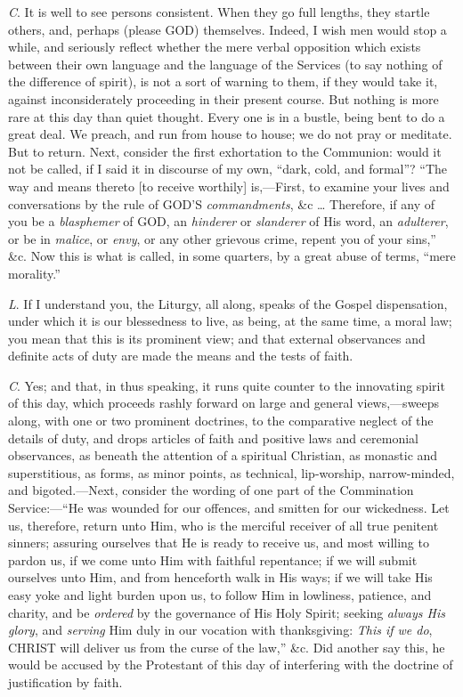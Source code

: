 \emph{C}. It is well to see persons consistent.
When they go full lengths, they startle others, and, perhaps (please GOD)
themselves. Indeed, I wish men would stop a while, and seriously
reflect whether the mere verbal opposition which exists between their
own language and the language of the Services (to say nothing of the
difference of spirit), is not a sort of warning to them, if they would
take it, against inconsiderately proceeding in their present course.
But nothing is more rare at this day than quiet thought. Every one is
in a bustle, being bent to do a great deal. We preach, and run from
house to house; we do not pray or meditate. But to return. Next,
consider the first exhortation to the Communion: would it not be
called, if I said it in discourse of my own, ``dark, cold, and formal''?
``The way and means thereto [to receive worthily] is,—First, to
examine your lives and conversations by the rule of GOD'S
\emph{commandments}, \&c … Therefore, if any of you be a \emph{blasphemer}
of GOD, an \emph{hinderer} or \emph{slanderer}
of His word, an \emph{adulterer}, or be in \emph{malice}, or \emph{envy},
or any other grievous crime, repent you of your sins,'' \&c. Now
this is what is called, in some quarters, by a great abuse of terms, ``mere
morality.''

\emph{L}. If I understand you, the Liturgy, all
along, speaks of the Gospel dispensation, under which it is our
blessedness to live, as being, at the same time, a moral law; you mean
that this is its prominent view; and that external observances and
definite acts of duty are made the means and the tests of faith.

\emph{C}. Yes; and that, in thus speaking, it
runs quite counter to the innovating spirit of this day, which
proceeds rashly forward on large and general views,—sweeps along,
with one or two prominent doctrines, to the comparative neglect of the
details of duty, and drops articles of faith and positive laws and
ceremonial observances, as beneath the attention of a spiritual
Christian, as monastic and superstitious, as forms, as minor points,
as technical, lip-worship, narrow-minded, and bigoted.—Next,
consider the wording of one part of the Commination Service:—``He was
wounded for our offences, and smitten for our wickedness. Let us,
therefore, return unto Him, who is the merciful receiver of all true
penitent sinners; assuring ourselves that He is ready to receive us,
and most willing to pardon us, if we come unto Him with faithful
repentance; if we will submit ourselves unto Him, and from henceforth
walk in His ways; if we will take His easy yoke and light burden upon
us, to follow Him in lowliness, patience, and charity, and be \emph{ordered}
by the governance of His Holy Spirit; seeking \emph{always His glory},
and \emph{serving} Him duly in our vocation with thanksgiving: \emph{This
if we do}, CHRIST will
deliver us from the curse of the law,'' \&c. Did another say this,
he would be accused by the Protestant of this day of interfering with
the doctrine of justification by faith.

